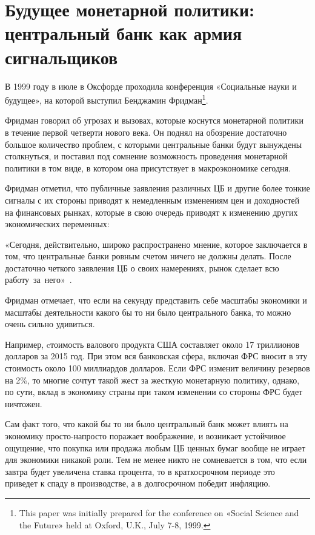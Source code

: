 \documentclass[14pt,a4paper, oneside]{extreport}
\begin{document}
\section{Будущее монетарной политики: центральный банк как армия \\ сигнальщиков}

В 1999 году в июле в Оксфорде проходила конференция «Социальные науки и будущее», на которой выступил Бенджамин Фридман\footnote{This paper was initially prepared for the conference on «Social Science and the Future» held at Oxford, U.K., July 7-8, 1999.}. 

Фридман говорил об угрозах и вызовах, которые коснутся монетарной политики в течение первой четверти нового века. Он поднял на обозрение достаточно большое количество проблем, с которыми  центральные банки будут вынуждены столкнуться, и поставил под сомнение возможность проведения монетарной политики в том виде, в котором она присутствует в макроэкономике сегодня. 
 
 Фридман отметил, что публичные заявления различных ЦБ и другие более тонкие сигналы с их стороны приводят к немедленным изменениям цен и доходностей на финансовых рынках, которые в свою очередь приводят к изменению других экономических переменных: 
 
«Сегодня, действительно, широко распространено мнение, которое заключается в том, что центральные банки ровным счетом ничего не должны делать. После достаточно четкого заявления ЦБ о своих намерениях, рынок сделает всю работу~за~него»~\cite{friedman1999future}.

Фридман отмечает, что если на секунду представить себе масштабы экономики и масштабы деятельности какого бы то ни было центрального банка, то можно очень сильно удивиться. 

Например, cтоимость валового продукта США составляет около 17 триллионов долларов за 2015 год. При этом вся банковская сфера, включая ФРС вносит в эту стоимость около 100 миллиардов долларов. Если ФРС изменит величину резервов на 2\%, то многие сочтут такой жест за жесткую монетарную политику, однако, по сути, вклад в экономику страны при таком изменении со стороны ФРС будет ничтожен. 

Сам факт того, что какой бы то ни было центральный банк может влиять на экономику просто-напросто поражает воображение, и возникает устойчивое ощущение, что покупка или продажа любым ЦБ ценных бумаг вообще не играет для экономики никакой роли. Тем не менее никто не сомневается в том, что если завтра будет увеличена ставка процента, то в краткосрочном периоде это приведет к спаду в производстве, а в долгосрочном победит инфляцию. 
\end{document}
